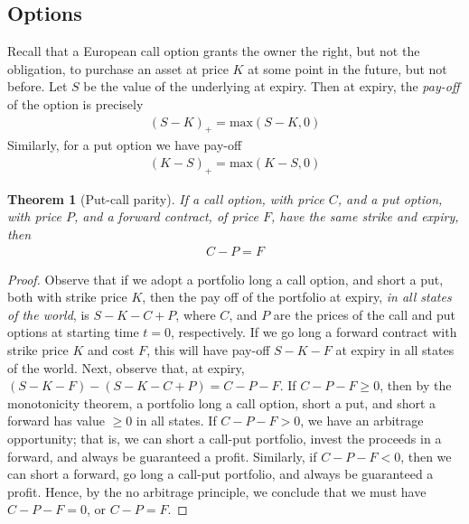 \documentclass[12pt]{amsbook}
\theoremstyle{plain}
\newtheorem{theorem}{Theorem}
\theoremstyle{definition}
\theoremstyle{remark}
\numberwithin{equation}{section}  %
\begin{document}
\subsection{Options}
Recall that a European call option grants the owner the right, but not the 
obligation, to purchase an asset at price $K$ at some point in the future, but 
not before. 
Let $S$ be the value of the underlying at expiry. Then at expiry, the 
\emph{pay-off} of the option is precisely
\begin{equation*}
	\begin{split}
		{(S - K)}_{+} = \text{max}(S - K, 0)
	\end{split}
\end{equation*}
Similarly, for a put option we have pay-off
\begin{equation*}
	\begin{split}
		{(K - S)}_{+} = \text{max}(K - S, 0)
	\end{split}
\end{equation*}
\begin{theorem}[Put-call parity]\label{thm:put-call}
	If a call option, with price $C$, and a put option, with price $P$, and a 
	forward contract, of price $F$, have the same strike and expiry, then
	\begin{equation*}
		\begin{split}
			C - P = F
		\end{split}
	\end{equation*}
\end{theorem}
\begin{proof}
	Observe that if we adopt a portfolio long a call option, and short a put,
	both with strike price $K$, then the pay off of the portfolio at expiry,
	\emph{in all states of the world}, is $S-K -C + P$, where $C$, and $P$ are
	the prices of the call and put options at starting time $t = 0$,
	respectively. If we go long a forward contract with strike price $K$ and
	cost $F$, this will have pay-off $S-K - F$ at expiry in all states of the
	world. 
	Next, observe that, at expiry, $(S - K - F) - (S - K - C + P) = C - P - F$.
	If $C - P - F \ge 0$, then by the monotonicity theorem, a portfolio long a
	call option, short a put, and short a forward has value $\ge 0$ in all
	states. If $C - P - F > 0$, we have an arbitrage opportunity; that is, we 
	can short a call-put portfolio, invest the proceeds in a forward, and 
	always be guaranteed a profit.
	Similarly, if $C - P - F < 0$, then we can short a forward, go long a 
	call-put portfolio, and always be guaranteed a profit. Hence, by the no 
	arbitrage principle, we
	conclude that we must have $C - P - F = 0$, or $C - P = F$. 
\end{proof}
\end{document}
